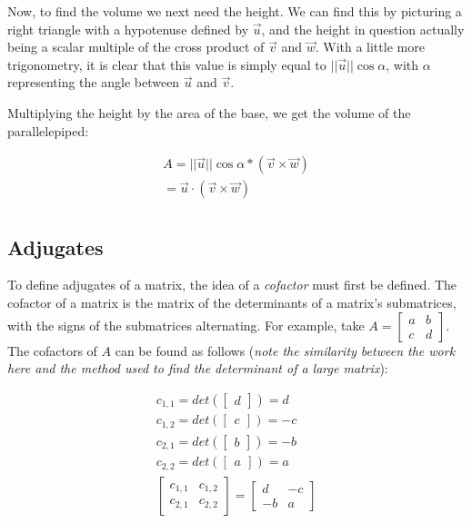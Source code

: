 \documentclass[12pt]{article}
\begin{document}
Now, to find the volume we next need the height. We can find this by picturing a right triangle with a hypotenuse defined by $\vec{u}$, and the height in question actually being a scalar multiple of the cross product of $\vec{v}$ and $\vec{w}$. With a little more trigonometry, it is clear that this value is simply equal to $||\vec{u}||\cos \alpha$, with $\alpha$ representing the angle between $\vec{u}$ and $\vec{v}$. 

Multiplying the height by the area of the base, we get the volume of the parallelepiped:

\begin{align*}
A = ||\vec{u}||\cos\alpha * (\vec{v} \times \vec{w})\\
= \vec{u}\cdot(\vec{v} \times \vec{w})\\
\end{align*}

\subsection{Adjugates}

To define adjugates of a matrix, the idea of a \textit{cofactor} must first be defined. The cofactor of a matrix is the matrix of the determinants of a matrix's submatrices, with the signs of the submatrices alternating. For example, take $A = \begin{bmatrix}
    a & b\\
    c & d
\end{bmatrix}$. The cofactors of $A$ can be found as follows (\textit{note the similarity between the work here and the method used to find the determinant of a large matrix}):

\begin{align*}
    c_{1,1} = det(\begin{bmatrix}
        d
    \end{bmatrix}) = d\\
    c_{1,2} = det(\begin{bmatrix}
        c
    \end{bmatrix}) = -c\\
    c_{2,1} = det(\begin{bmatrix}
        b
    \end{bmatrix}) = -b\\
    c_{2,2} = det(\begin{bmatrix}
        a
    \end{bmatrix}) = a\\
    \begin{bmatrix}
        c_{1,1} & c_{1,2}\\
        c_{2,1} & c_{2,2}
    \end{bmatrix} = \begin{bmatrix}
        d & -c\\
        -b & a
    \end{bmatrix}
\end{align*}
\end{document}
